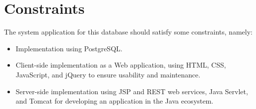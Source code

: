 \section{Constraints}
The system application for this database should satisfy some constraints, namely:
\begin{itemize}
    \item Implementation using PostgreSQL.
    \item Client-side implementation as a Web application, using HTML, CSS, JavaScript, and jQuery to ensure usability and maintenance.
    \item Server-side implementation using JSP and REST web services, Java Servlet, and Tomcat for developing an application in the Java ecosystem.
\end{itemize}
